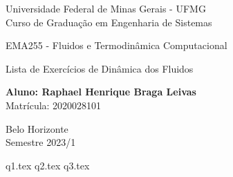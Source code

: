 \documentclass[12pt]{scrartcl}
\begin{document}
\begin{titlepage}
    \begin{center}
        \begin{Large}
            Universidade Federal de Minas Gerais - UFMG\\
            Curso de Graduação em Engenharia de Sistemas\\

            \vspace{5.0cm}


            EMA255 - Fluidos e Termodinâmica Computacional

            \vspace{5.0cm}

            Lista de Exercícios de Dinâmica dos Fluidos
            \vspace*{1cm}

            \textbf{Aluno: Raphael Henrique Braga Leivas}\\
            \vspace*{1cm}
            Matrícula: 2020028101

            \vspace{7cm}

            Belo Horizonte\\
            \vspace*{1cm}
            Semestre 2023/1
        \end{Large}
    \end{center}
\end{titlepage}

\pagestyle{fancy}

\fancyhead{}
\fancyfoot{}

{q1.tex}
{q2.tex}
{q3.tex}
\end{document}
